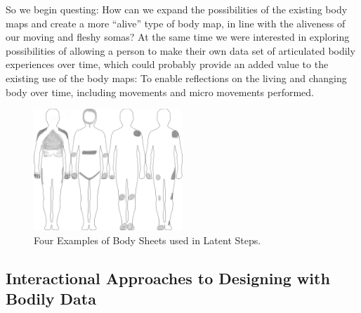 So we begin questing: How can we expand the possibilities of the existing body maps and create a more ``alive'' type of body map, in line with the aliveness of our moving and fleshy somas? At the same time we were interested in exploring possibilities of allowing a person to make their own data set of articulated bodily experiences over time, which could probably provide an added value to the existing use of the body maps: To enable reflections on the living and changing body over time, including movements and micro movements performed.


\begin{figure}[ht]
    \centering
    \includegraphics[width=0.5\textwidth]{Chapters/Figures/modi_dis/drawing_samples2.png}
    \caption{Four Examples of Body Sheets used in Latent Steps.}
    \label{fig:draw_samples}
\end{figure}

\subsection*{Interactional Approaches to Designing with Bodily Data}


